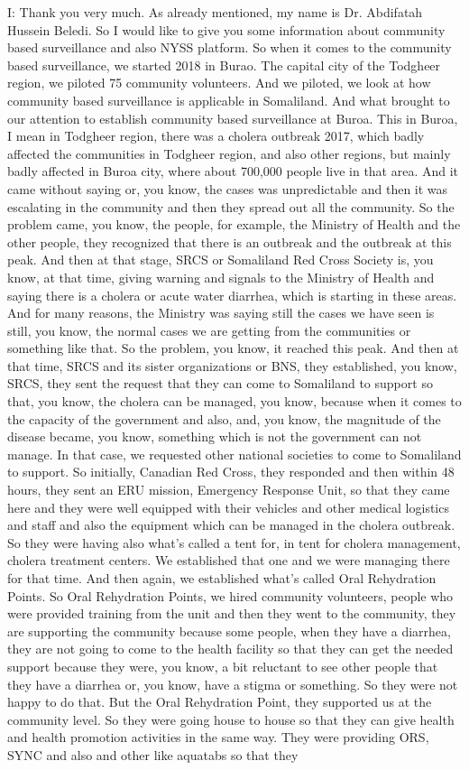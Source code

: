 I: Thank you very much. As already mentioned, my name is Dr. Abdifatah Hussein Beledi. So I would like to give you some information about community based surveillance and also NYSS platform. So when it comes to the community based surveillance, we started 2018 in Burao. The capital city of the Todgheer region, we piloted 75 community volunteers. And we piloted, we look at how community based surveillance is applicable in Somaliland. And what brought to our attention to establish community based surveillance at Buroa. This in Buroa, I mean in Todgheer region, there was a cholera outbreak 2017, which badly affected the communities in Todgheer region, and also other regions, but mainly badly affected in Buroa city, where about 700,000 people live in that area. And it came without saying or, you know, the cases was unpredictable and then it was escalating in the community and then they spread out all the community. So the problem came, you know, the people, for example, the Ministry of Health and the other people, they recognized that there is an outbreak and the outbreak at this peak. And then at that stage, SRCS or Somaliland Red Cross Society is, you know, at that time, giving warning and signals to the Ministry of Health and saying there is a cholera or acute water diarrhea, which is starting in these areas. And for many reasons, the Ministry was saying still the cases we have seen is still, you know, the normal cases we are getting from the communities or something like that. So the problem, you know, it reached this peak. And then at that time, SRCS and its sister organizations or BNS, they established, you know, SRCS, they sent the request that they can come to Somaliland to support so that, you know, the cholera can be managed, you know, because when it comes to the capacity of the government and also, and, you know, the magnitude of the disease became, you know, something which is not the government can not manage. In that case, we requested other national societies to come to Somaliland to support. So initially, Canadian Red Cross, they responded and then within 48 hours, they sent an ERU mission, Emergency Response Unit, so that they came here and they were well equipped with their vehicles and other medical logistics and staff and also the equipment which can be managed in the cholera outbreak. So they were having also what's called a tent for, in tent for cholera management, cholera treatment centers. We established that one and we were managing there for that time. And then again, we established what's called Oral Rehydration Points. So Oral Rehydration Points, we hired community volunteers, people who were provided training from the unit and then they went to the community, they are supporting the community because some people, when they have a diarrhea, they are not going to come to the health facility so that they can get the needed support because they were, you know, a bit reluctant to see other people that they have a diarrhea or, you know, have a stigma or something. So they were not happy to do that. But the Oral Rehydration Point, they supported us at the community level. So they were going house to house so that they can give health and health promotion activities in the same way. They were providing ORS, SYNC and also and other like aquatabs so that they 